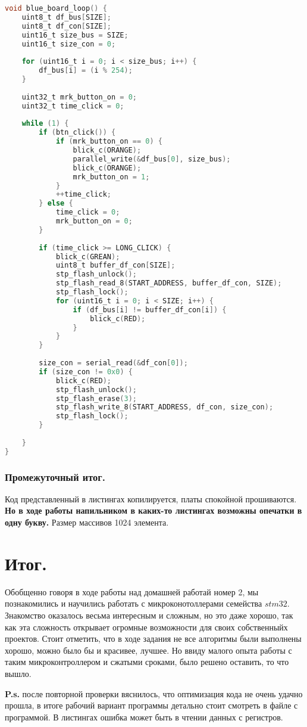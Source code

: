 \documentclass{bmstu}
\begin{document}
	\begingroup
	\fontsize{12pt}{12pt}\selectfont
	\begin{lstlisting}[language=C]
void blue_board_loop() {
	uint8_t df_bus[SIZE];
	uint8_t df_con[SIZE];
	uint16_t size_bus = SIZE;
	uint16_t size_con = 0;
	
	for (uint16_t i = 0; i < size_bus; i++) {
		df_bus[i] = (i % 254);
	}
	
	uint32_t mrk_button_on = 0;
	uint32_t time_click = 0;
	
	while (1) {
		if (btn_click()) {
			if (mrk_button_on == 0) {
				blick_c(ORANGE);
				parallel_write(&df_bus[0], size_bus);
				blick_c(ORANGE);
				mrk_button_on = 1;
			}
			++time_click;
		} else {
			time_click = 0;
			mrk_button_on = 0;
		}
		
		if (time_click >= LONG_CLICK) {
			blick_c(GREAN);
			uint8_t buffer_df_con[SIZE];
			stp_flash_unlock();
			stp_flash_read_8(START_ADDRESS, buffer_df_con, SIZE);
			stp_flash_lock();
			for (uint16_t i = 0; i < SIZE; i++) {
				if (df_bus[i] != buffer_df_con[i]) {
					blick_c(RED); 
				}
			}
		}
		
		size_con = serial_read(&df_con[0]);
		if (size_con != 0x0) {
			blick_c(RED);
			stp_flash_unlock();
			stp_flash_erase(3);
			stp_flash_write_8(START_ADDRESS, df_con, size_con);
			stp_flash_lock();
		}
		
	}
}
	\end{lstlisting}
	\endgroup
	
	\subsection{Промежуточный итог.}
	
	Код представленный в листингах копилируется, платы спокойной прошиваются. \textbf{Но в ходе работы напильником в каких-то листингах возможны опечатки в одну букву.}
	Размер массивов 1024 элемента.

	\chapter{Итог.}

	Обобщенно говоря в ходе работы над домашней работай номер 2, мы познакомились и научились работать с микроконотоллерами семейства $stm32$.
	Знакомство оказалось весьма интересным и сложным, но это даже хорошо, так как эта сложность открывает огромные возможности для своих собственныйх проектов.
	Стоит отметить, что в ходе задания не все алгоритмы были выполнены хорошо, можно было бы и красивее, лучшее. Но ввиду малого опыта работы с таким микроконтроллером и сжатыми сроками, было решено оставить, то что вышло.
	
	\newpage
	\begingroup
	\fontsize{10pt}{10pt}\selectfont
	\textbf{P.s.} после повторной проверки вяснилось, что оптимизация кода не очень удачно прошла, в итоге рабочий вариант программы детально стоит смотреть в файле с программой. В листингах ошибка может быть в чтении данных с регистров.
	\endgroup
\end{document}
